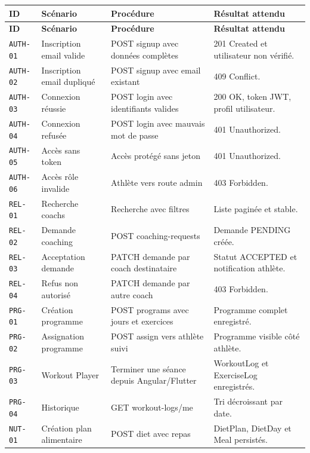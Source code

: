 \begin{longtable}{|p{2.2cm}|p{4cm}|p{5.2cm}|p{5cm}|}
\hline
\rowcolor[HTML]{DAE8FC}
\textbf{ID} & \textbf{Scénario} & \textbf{Procédure} & \textbf{Résultat attendu} \\ \hline
\endfirsthead
\hline
\rowcolor[HTML]{DAE8FC}
\textbf{ID} & \textbf{Scénario} & \textbf{Procédure} & \textbf{Résultat attendu} \\ \hline
\endhead
\texttt{AUTH-01} & Inscription email valide & POST signup avec données complètes & 201 Created et utilisateur non vérifié. \\ \hline
\texttt{AUTH-02} & Inscription email dupliqué & POST signup avec email existant & 409 Conflict. \\ \hline
\texttt{AUTH-03} & Connexion réussie & POST login avec identifiants valides & 200 OK, token JWT, profil utilisateur. \\ \hline
\texttt{AUTH-04} & Connexion refusée & POST login avec mauvais mot de passe & 401 Unauthorized. \\ \hline
\texttt{AUTH-05} & Accès sans token & Accès protégé sans jeton & 401 Unauthorized. \\ \hline
\texttt{AUTH-06} & Accès rôle invalide & Athlète vers route admin & 403 Forbidden. \\ \hline
\texttt{REL-01} & Recherche coachs & Recherche avec filtres & Liste paginée et stable. \\ \hline
\texttt{REL-02} & Demande coaching & POST coaching-requests & Demande PENDING créée. \\ \hline
\texttt{REL-03} & Acceptation demande & PATCH demande par coach destinataire & Statut ACCEPTED et notification athlète. \\ \hline
\texttt{REL-04} & Refus non autorisé & PATCH demande par autre coach & 403 Forbidden. \\ \hline
\texttt{PRG-01} & Création programme & POST programs avec jours et exercices & Programme complet enregistré. \\ \hline
\texttt{PRG-02} & Assignation programme & POST assign vers athlète suivi & Programme visible côté athlète. \\ \hline
\texttt{PRG-03} & Workout Player & Terminer une séance depuis Angular/Flutter & WorkoutLog et ExerciseLog enregistrés. \\ \hline
\texttt{PRG-04} & Historique & GET workout-logs/me & Tri décroissant par date. \\ \hline
\texttt{NUT-01} & Création plan alimentaire & POST diet avec repas & DietPlan, DietDay et Meal persistés. \\ \hline

\end{longtable}
